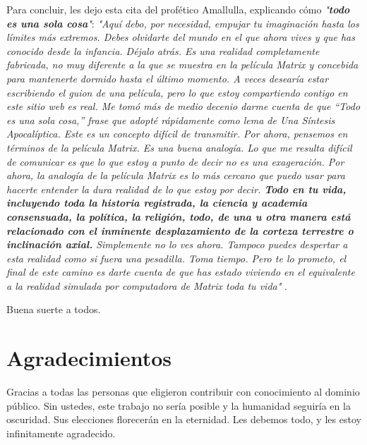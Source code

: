 \documentclass[10pt,twocolumn,letterpaper]{article}
\begin{document}
Para concluir, les dejo esta cita del profético Amallulla, explicando cómo \textit{"\textbf{todo es una sola cosa}"}: \textit{"Aquí debo, por necesidad, empujar tu imaginación hasta los límites más extremos. Debes olvidarte del mundo en el que ahora vives y que has conocido desde la infancia. Déjalo atrás. Es una realidad completamente fabricada, no muy diferente a la que se muestra en la película Matrix y concebida para mantenerte dormido hasta el último momento. A veces desearía estar escribiendo el guion de una película, pero lo que estoy compartiendo contigo en este sitio web es real. Me tomó más de medio decenio darme cuenta de que “Todo es una sola cosa,” frase que adopté rápidamente como lema de Una Síntesis Apocalíptica. Este es un concepto difícil de transmitir. Por ahora, pensemos en términos de la película Matrix. Es una buena analogía. Lo que me resulta difícil de comunicar es que lo que estoy a punto de decir no es una exageración. Por ahora, la analogía de la película Matrix es lo más cercano que puedo usar para hacerte entender la dura realidad de lo que estoy por decir. \textbf{Todo en tu vida, incluyendo toda la historia registrada, la ciencia y academia consensuada, la política, la religión, todo, de una u otra manera está relacionado con el inminente desplazamiento de la corteza terrestre o inclinación axial.} Simplemente no lo ves ahora. Tampoco puedes despertar a esta realidad como si fuera una pesadilla. Toma tiempo. Pero te lo prometo, el final de este camino es darte cuenta de que has estado viviendo en el equivalente a la realidad simulada por computadora de Matrix toda tu vida"} \cite{33,34}.

Buena suerte a todos.

\section{Agradecimientos}

Gracias a todas las personas que eligieron contribuir con conocimiento al dominio público. Sin ustedes, este trabajo no sería posible y la humanidad seguiría en la oscuridad. Sus elecciones florecerán en la eternidad. Les debemos todo, y les estoy infinitamente agradecido.

\clearpage
\twocolumn

{\small
\renewcommand{\refname}{Referencias}


}
\end{document}
